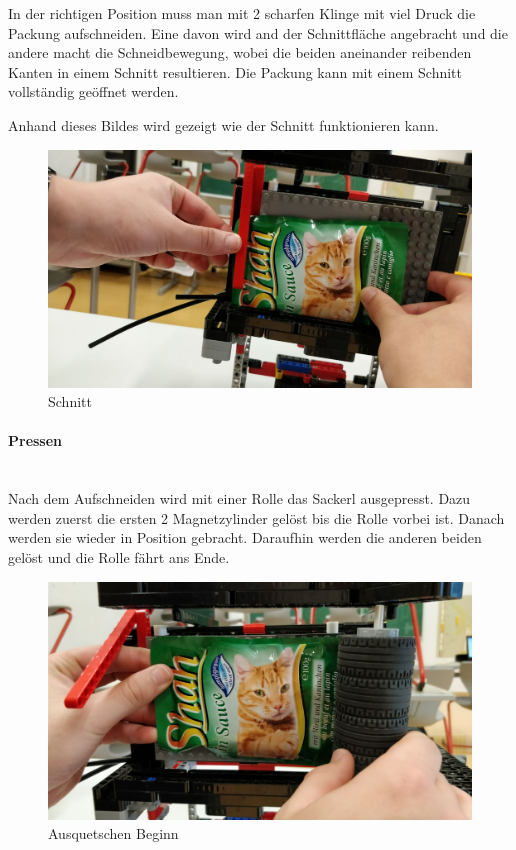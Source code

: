 \documentclass[a4paper,12pt]{scrartcl}
\begin{document}
In der richtigen Position muss man mit 2 scharfen Klinge mit viel Druck die Packung aufschneiden. Eine davon wird and der Schnittfläche angebracht und die andere macht die Schneidbewegung, wobei die beiden aneinander reibenden Kanten in einem Schnitt resultieren. Die Packung kann mit einem Schnitt vollständig geöffnet werden.

Anhand dieses Bildes wird gezeigt wie der Schnitt funktionieren kann.

\begin{figure}[H]
\begin{center}
\includegraphics[width=13cm]{Bilder/Ablauf_1_png/Schnitt}
\caption{Schnitt}
\end{center}
\end{figure} 

\newpage
\paragraph{Pressen}$~~$\\

Nach dem Aufschneiden wird mit einer Rolle das Sackerl ausgepresst. Dazu werden zuerst die ersten 2 Magnetzylinder gelöst bis die Rolle vorbei ist. Danach werden sie wieder in Position gebracht. Daraufhin werden die anderen beiden gelöst und die Rolle fährt ans Ende.

\begin{figure}[H]
\begin{center}
\includegraphics[width=13cm]{Bilder/Ablauf_1_png/Ausquetschen_1}
\caption{Ausquetschen Beginn}
\end{center}
\end{figure}
\end{document}

